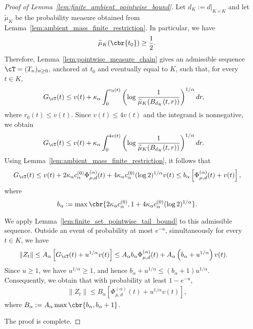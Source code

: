 \documentclass[11pt]{article}
\begin{document}
\begin{proof}[Proof of Lemma~\ref{lem:finite_ambient_pointwise_bound}]
Let $d_K:=d|_{K\times K}$ and let $\widetilde\mu_K$ be the
probability measure obtained from
Lemma~\ref{lem:ambient_mass_finite_restriction}. In particular, we have
\begin{align*}
\widetilde\mu_K(\cbr{t_0})\ge\frac12.
\end{align*}
Therefore, Lemma~\ref{lem:pointwise_measure_chain} gives an admissible
sequence $\cT=(T_n)_{n\ge0}$, anchored at $t_0$ and eventually equal
to $K$, such that, for every $t\in K$,
\begin{align*}
G_{\cT}(t)
&\le
v(t)
+
\kappa_\alpha
\int_0^{r_0(t)}
\left(
\log\frac{1}{\widetilde\mu_K(B_{d_K}(t,r))}
\right)^{1/\alpha}dr,
\end{align*}
where $r_0(t)\le v(t)$. Since $v(t)\le4v(t)$ and the integrand is
nonnegative, we obtain
\begin{align*}
G_{\cT}(t)
&\le
v(t)
+
\kappa_\alpha
\int_0^{4v(t)}
\left(
\log\frac{1}{\widetilde\mu_K(B_{d_K}(t,r))}
\right)^{1/\alpha}dr.
\end{align*}
Using Lemma~\ref{lem:ambient_mass_finite_restriction}, it follows that
\begin{align*}
G_{\cT}(t)\le
v(t)
+2\kappa_\alpha c_\alpha^{(0)}
\Phi_{\mu,d}^{(\alpha)}(t)+
4\kappa_\alpha c_\alpha^{(0)}
(\log2)^{1/\alpha}v(t)\le
b_\alpha
\left[
\Phi_{\mu,d}^{(\alpha)}(t)+v(t)
\right],
\end{align*}
where
\begin{align*}
b_\alpha
:=
\max\cbr{
2\kappa_\alpha c_\alpha^{(0)},
1+4\kappa_\alpha c_\alpha^{(0)}(\log2)^{1/\alpha}
}.
\end{align*}

We apply Lemma~\ref{lem:finite_set_pointwise_tail_bound} to this
admissible sequence. Outside an event of probability at most $e^{-u}$,
simultaneously for every $t\in K$, we have
\begin{align*}
\|Z_t\|
&\le
A_\alpha
\left[
G_{\cT}(t)+u^{1/\alpha}v(t)
\right]\le
A_\alpha b_\alpha\Phi_{\mu,d}^{(\alpha)}(t)
+A_\alpha\left(b_\alpha+u^{1/\alpha}\right)v(t).
\end{align*}
Since $u\ge1$, we have $u^{1/\alpha}\ge1$, and hence $b_\alpha+u^{1/\alpha}
\le
(b_\alpha+1)u^{1/\alpha}$.
Consequently, we obtain that with probability at least $1-e^{-u}$,
\begin{align*}
\|Z_t\|
\le
B_\alpha
\left[
\Phi_{\mu,d}^{(\alpha)}(t)
+u^{1/\alpha}v(t)
\right],
\end{align*}
where $B_\alpha
:=
A_\alpha\max\cbr{b_\alpha,b_\alpha+1}$.

The proof is complete.
\end{proof}
\end{document}
